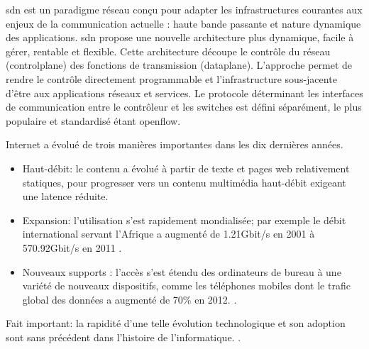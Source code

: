\gls{sdn} est un \gls{paradigme} réseau conçu pour adapter les infrastructures courantes aux enjeux de la communication actuelle : haute bande passante et nature dynamique des applications. \gls{sdn} propose une nouvelle architecture plus dynamique, facile à gérer, rentable et flexible. Cette architecture découpe le contrôle du réseau (\gls{controlplane}) des fonctions de transmission (\gls{dataplane}). L'approche permet de rendre le contrôle directement programmable et l'infrastructure sous-jacente d'être  aux applications réseaux et services. Le protocole déterminant les interfaces de communication entre le contrôleur et les switches est défini séparément, le plus populaire et standardisé étant \gls{openflow}. \cite{OpenFlowStanford} \cite{ODCAintro} \cite{SDNNewNormONFExecutiveSummary}

Internet a évolué de trois manières importantes dans les dix dernières années. 
\begin{itemize}
\item Haut-débit: le contenu a évolué à partir de texte et pages web relativement statiques, pour progresser vers un contenu multimédia haut-débit exigeant une latence réduite. 
\item Expansion: l'utilisation s'est rapidement mondialisée; par exemple le débit international servant l'Afrique a augmenté de 1.21Gbit/s en 2001 à 570.92Gbit/s en 2011 \cite{InternetGlobalGrowthImpactDevelopingCountries}.
\item  Nouveaux supports : l'accès s'est étendu des ordinateurs de bureau à une variété de nouveaux dispositifs, comme les téléphones mobiles dont le trafic global des données a augmenté de 70\% en 2012. \cite{CiscoVNI2013}. 
\end{itemize}
Fait important: la rapidité d'une telle évolution technologique et son adoption sont sans précédent dans l'histoire de l'informatique. \cite{InternetGlobalGrowthImpactDevelopingCountries}.



